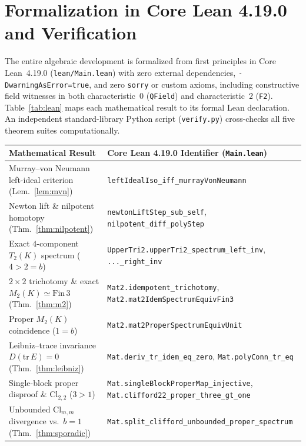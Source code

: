 \documentclass[11pt,a4paper]{article}
\theoremstyle{definition}
\newcommand{\Cl}{\mathrm{Cl}}
\newcommand{\tr}{\mathrm{tr}}
\begin{document}
\section{Formalization in Core Lean 4.19.0 and Verification}

The entire algebraic development is formalized from first principles in Core Lean~4.19.0
(\texttt{lean/Main.lean}) with zero external dependencies, \texttt{-DwarningAsError=true},
and zero \texttt{sorry} or custom axioms, including constructive field witnesses in both
characteristic~$0$ (\texttt{QField}) and characteristic~$2$ (\texttt{F2}).
Table~\ref{tab:lean} maps each mathematical result to its formal Lean declaration. An
independent standard-library Python script (\texttt{verify.py}) cross-checks all five theorem
suites computationally.

\begin{table}[!ht]
\centering
\footnotesize
\begin{tabular}{|>{\raggedright\arraybackslash}p{}|>{\raggedright\arraybackslash}p{}|}
\hline
\textbf{Mathematical Result} & \textbf{Core Lean 4.19.0 Identifier (\texttt{Main.lean})} \\
\hline
Murray--von Neumann left-ideal criterion (Lem.~\ref{lem:mvn}) &
  \texttt{leftIdealIso\_iff\_murrayVonNeumann} \\
Newton lift \& nilpotent homotopy (Thm.~\ref{thm:nilpotent}) &
  \texttt{newtonLiftStep\_sub\_self}, \texttt{nilpotent\_diff\_polyStep} \\
Exact $4$-component $T_2(K)$ spectrum ($4>2=b$) &
  \texttt{UpperTri2.upperTri2\_spectrum\_left\_inv}, \texttt{...\_right\_inv} \\
$2\times 2$ trichotomy \& exact $M_2(K)\simeq\mathrm{Fin}\,3$ (Thm.~\ref{thm:m2}) &
  \texttt{Mat2.idempotent\_trichotomy}, \texttt{Mat2.mat2IdemSpectrumEquivFin3} \\
Proper $M_2(K)$ coincidence ($1=b$) &
  \texttt{Mat2.mat2ProperSpectrumEquivUnit} \\
Leibniz--trace invariance $D(\tr\,E)=0$ (Thm.~\ref{thm:leibniz}) &
  \texttt{Mat.deriv\_tr\_idem\_eq\_zero}, \texttt{Mat.polyConn\_tr\_eq} \\
Single-block proper disproof \& $\Cl_{2,2}$ ($3>1$) &
  \texttt{Mat.singleBlockProperMap\_injective}, \texttt{Mat.clifford22\_proper\_three\_gt\_one} \\
Unbounded $\Cl_{m,m}$ divergence vs.\ $b=1$ (Thm.~\ref{thm:sporadic}) &
  \texttt{Mat.split\_clifford\_unbounded\_proper\_spectrum} \\

\end{tabular}
\end{table}
\end{document}
